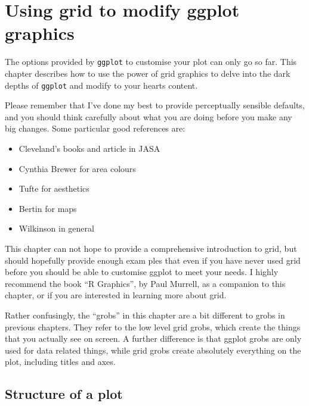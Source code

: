 


\chapter{Using grid to modify ggplot graphics}

The options provided by {\tt ggplot} to customise your plot can only go so far.  This chapter describes how to use the power of grid graphics to delve into the dark depths of {\tt ggplot} and modify to your hearts content.  

Please remember that I've done my best to provide perceptually sensible defaults, and you should think carefully about what you are doing before you make any big changes.  Some particular good references are:

\begin{itemize}
	\item Cleveland's books and article in JASA
	\item Cynthia Brewer for area colours
	\item Tufte for aesthetics
	\item Bertin for maps
	\item Wilkinson in general
\end{itemize}

This chapter can not hope to provide a comprehensive introduction to grid, but should hopefully provide enough exam	ples that even if you have never used grid before you should be able to customise ggplot to meet your needs.  I highly recommend the book ``R Graphics'', by Paul Murrell, as a companion to this chapter, or if you are interested in learning more about grid.   

Rather confusingly, the ``grobs'' in this chapter are a bit different to grobs in previous chapters.  They refer to the low level grid grobs, which create the things that you actually see on screen.  A further difference is that ggplot grobs are only used for data related things, while grid grobs create absolutely everything on the plot, including titles and axes.

\section{Structure of a plot}\label{sec:structure_of_a_plot}

